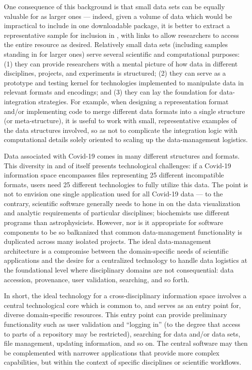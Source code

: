 \documentclass[11pt,letterpaper]{article}
\newcommand{\textscc}[1]{{\color{orr!35!black}{{%
						\fontfamily{Cabin-TLF}\fontseries{b}\selectfont{\textsc{\scriptsize{#1}}}}}}}
\newcommand{\AcronymText}[1]{{\textscc{#1}}}
\newcommand{\CRtwo}{{\resizebox{!}{7pt}{\AcronymText{CR2}}}}
\newcommand{\p}[1]{

\vspace{.75em}#1}
\newcommand{\q}[1]{{\fontfamily{qcr}\selectfont ``}#1{\fontfamily{qcr}\selectfont ''}}
\begin{document}
{\p{One consequence of this background is that small 
data sets can be equally valuable for \CRtwo{} as 
larger ones --- indeed, given a volume of data 
which would be impractical to include in one 
downloadable package, it is better to extract a 
representative sample for inclusion in \CRtwo{}, 
with links to allow researchers to access the entire 
resource as desired.  Relatively small data 
sets (including samples standing in for larger 
ones) serve several scientific and computational 
purposes: (1) they can provide researchers 
with a mental picture of how data in different 
disciplines, projects, and experiments is structured; 
(2) they can serve as a prototype and testing 
kernel for technologies implemented to manipulate 
data in relevant formats and encodings; and 
(3) they can lay the foundation for data-integration 
strategies.  For example, when designing a 
representation format and/or implementing code 
to merge different data formats into a single 
structure (or meta-structure), it is useful 
to work with small, representative examples 
of the data structures involved, so as not 
to complicate the integration logic with 
computational details solely oriented to 
scaling up the data-management logistics.}

\p{Data associated with Covid-19 comes in many 
different structures and formats.  This diversity 
in and of itself presents technological challenges: 
if a Covid-19 information space encompasses 
files representing 25 different incompatible 
formats, users need 25 different technologies 
to fully utilize this data.  The point is not 
to envision one single application used for 
all Covid-19 data --- to the contrary, 
scientific software generally needs to hone in 
on the data visualization and analytic 
requirements of particular disciplines; 
biochemists use different programs than 
astrophysicists.  However, nor is it 
appropriate for software components to be so 
balkanized that common data-management 
functionality is duplicated across 
many isolated projects.  The ideal data-management 
architecture is a compromise between the 
domain-specific needs of scientific applications 
and the desire for a centralized technology 
to handle data logistics at the foundational 
level where disciplinary domains are not 
consequential: data accession, provenance, 
user validation, searching, and so forth.}

\p{In short, the ideal technology for a 
cross-disciplinary information space involves a 
central technological core which is 
common to, and serves as an entry point 
for, diverse domain-specific resources.  
This entry point can provide preliminary 
functionality such as user validation and 
\q{logging in} (to the degree that access 
to parts of a repository may be restricted), 
searching for data and/or data sets, file 
management, updating information, and so on.  
The central software may then be complemented 
with narrower applications that provide 
more complex capabilities, but within the 
context of specific disciplines or scientific 
workflows.}

}
\end{document}
